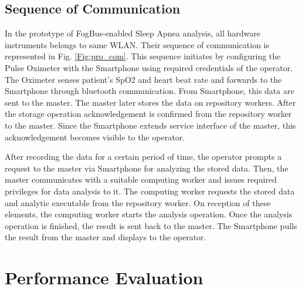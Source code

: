 \documentclass[final,5p,times,twocolumn]{elsarticle}
\begin{document}
\subsection{Sequence of Communication}
In the prototype of FogBus-enabled Sleep Apnea analysis, all hardware instruments belongs to same WLAN. Their sequence of communication is represented in Fig. \ref{Fig:pro_com}. This sequence initiates by configuring the Pulse Oximeter with the Smartphone using required credentials of the operator. The Oximeter senses patient's SpO2 and heart beat rate and forwards to the Smartphone through bluetooth communication. From Smartphone, this data are sent to the master. The master later stores the data on repository workers. After the storage operation acknowledgement is confirmed from the repository worker to the master. Since the Smartphone extends service interface of the master, this acknowledgement becomes visible to the operator. 
\par After recording the data for a certain period of time, the operator prompts a request to the master via Smartphone for analyzing the stored data. Then, the master communicates with a suitable computing worker and issues required privileges for data analysis to it. The computing worker requests the stored data and analytic executable from the repository worker. On reception of these elements, the computing worker starts the analysis operation. Once the analysis operation is finished, the result is sent back to the master. The Smartphone pulls the result from the master and displays to the operator.                 
%
\section{Performance Evaluation} \label{performance}
\end{document}
